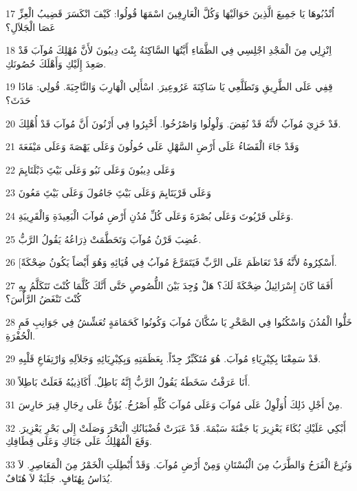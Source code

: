 \par 17 اُنْدُبُوهَا يَا جَمِيعَ الَّذِينَ حَوَالَيْهَا وَكُلَّ الْعَارِفِينَ اسْمَهَا قُولُوا: كَيْفَ انْكَسَرَ قَضِيبُ الْعِزِّ عَصَا الْجَلاَلِ؟
\par 18 اِنْزِلِي مِنَ الْمَجْدِ اجْلِسِي فِي الظَّمَاءِ أَيَّتُهَا السَّاكِنَةُ بِنْتَ دِيبُونَ لأَنَّ مُهْلِكَ مُوآبَ قَدْ صَعِدَ إِلَيْكِ وَأَهْلَكَ حُصُونَكِ.
\par 19 قِفِي عَلَى الطَّرِيقِ وَتَطَلَّعِي يَا سَاكِنَةَ عَرُوعِيرَ. اسْأَلِي الْهَارِبَ وَالنَّاجِيَةَ. قُولِي: مَاذَا حَدَثَ؟
\par 20 قَدْ خَزِيَ مُوآبُ لأَنَّهُ قَدْ نُقِضَ. وَلْوِلُوا وَاصْرُخُوا. أَخْبِرُوا فِي أَرْنُونَ أَنَّ مُوآبَ قَدْ أُهْلِكَ.
\par 21 وَقَدْ جَاءَ الْقَضَاءُ عَلَى أَرْضِ السَّهْلِ عَلَى حُولُونَ وَعَلَى يَهْصَةَ وَعَلَى مَيْفَعَةَ
\par 22 وَعَلَى دِيبُونَ وَعَلَى نَبُو وَعَلَى بَيْتَِ دَبْلَتَايِمَ
\par 23 وَعَلَى قَرْيَتَايِمَ وَعَلَى بَيْتَِ جَامُولَ وَعَلَى بَيْتَِ مَعُونَ
\par 24 وَعَلَى قَرْيُوتَ وَعَلَى بُصْرَةَ وَعَلَى كُلِّ مُدُنِ أَرْضِ مُوآبَ الْبَعِيدَةِ وَالْقَرِيبَةِ.
\par 25 عُضِبَ قَرْنُ مُوآبَ وَتَحَطَّمَتْ ذِرَاعُهُ يَقُولُ الرَّبُّ.
\par 26 [أَسْكِرُوهُ لأَنَّهُ قَدْ تَعَاظَمَ عَلَى الرَّبِّ فَيَتَمَرَّغَ مُوآبُ فِي قُيَائِهِ وَهُوَ أَيْضاً يَكُونُ ضِحْكَةً.
\par 27 أَفَمَا كَانَ إِسْرَائِيلُ ضِحْكَةً لَكَ؟ هَلْ وُجِدَ بَيْنَ اللُّصُوصِ حَتَّى أَنَّكَ كُلَّمَا كُنْتَ تَتَكَلَّمُ بِهِ كُنْتَ تَنْغَضُ الرَّأْسَ؟
\par 28 خَلُّوا الْمُدُنَ وَاسْكُنُوا فِي الصَّخْرِ يَا سُكَّانَ مُوآبَ وَكُونُوا كَحَمَامَةٍ تُعَشِّشُ فِي جَوَانِبِ فَمِ الْحُفْرَةِ.
\par 29 قَدْ سَمِعْنَا بِكِبْرِيَاءِ مُوآبَ. هُوَ مُتَكَبِّرٌ جِدّاً. بِعَظَمَتِهِ وَبِكِبْرِيَائِهِ وَجَلاَلِهِ وَارْتِفَاعِ قَلْبِهِ.
\par 30 أَنَا عَرَفْتُ سَخَطَهُ يَقُولُ الرَّبُّ إِنَّهُ بَاطِلٌ. أَكَاذِيبُهُ فَعَلَتْ بَاطِلاً.
\par 31 مِنْ أَجْلِ ذَلِكَ أُوَلْوِلُ عَلَى مُوآبَ وَعَلَى مُوآبَ كُلِّهِ أَصْرُخُ. يُؤَنُّ عَلَى رِجَالِ قِيرَ حَارِسَ.
\par 32 أَبْكِي عَلَيْكِ بُكَاءَ يَعْزِيرَ يَا جَفْنَةَ سَبْمَةَ. قَدْ عَبَرَتْ قُضْبَانُكِ الْبَحْرَ وَصَلَتْ إِلَى بَحْرِ يَعْزِيرَ. وَقَعَ الْمُهْلِكُ عَلَى جَنَاكِ وَعَلَى قِطَافِكِ.
\par 33 وَنُزِعَ الْفَرَحُ وَالطَّرَبُ مِنَ الْبُسْتَانِ وَمِنْ أَرْضِ مُوآبَ. وَقَدْ أُبْطِلَتِ الْخَمْرُ مِنَ الْمَعَاصِرِ. لاَ يُدَاسُ بِهُتَافٍ. جَلَبَةٌ لاَ هُتَافٌ.
